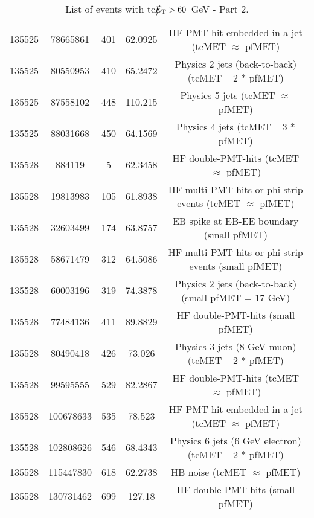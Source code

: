 \begin{table}[htbp]
\begin{center}
\begin{tabular}{|c|c|c|c|c|}
      135525  & 78665861     & 401  &    62.0925 & HF PMT hit embedded in a jet (tcMET $\approx$ pfMET) \\
      135525  & 80550953     & 410  &    65.2472 & Physics 2 jets (back-to-back) (tcMET ~ 2 * pfMET) \\
      135525  & 87558102     & 448  &    110.215 & Physics 5 jets (tcMET $\approx$ pfMET) \\ 
      135525  & 88031668     & 450  &    64.1569 & Physics 4 jets (tcMET ~ 3 * pfMET) \\
      135528  & 884119       & 5    &    62.3458 & HF double-PMT-hits (tcMET $\approx$ pfMET) \\
      135528  & 19813983     & 105  &    61.8938 & HF multi-PMT-hits or phi-strip events (tcMET $\approx$ pfMET) \\
      135528  & 32603499     & 174  &    63.8757 & EB spike at EB-EE boundary (small pfMET) \\
      135528  & 58671479     & 312  &    64.5086 & HF multi-PMT-hits or phi-strip events (small pfMET) \\
      135528  & 60003196     & 319  &    74.3878 & Physics 2 jets (back-to-back) (small pfMET = 17 GeV) \\
      135528  & 77484136     & 411  &    89.8829 & HF double-PMT-hits (small pfMET) \\
      135528  & 80490418     & 426  &    73.026  & Physics 3 jets (8 GeV muon) (tcMET ~ 2 * pfMET) \\
      135528  & 99595555     & 529  &    82.2867 & HF double-PMT-hits (tcMET $\approx$ pfMET) \\
      135528  & 100678633    & 535  &    78.523  & HF PMT hit embedded in a jet (tcMET $\approx$ pfMET) \\
      135528  & 102808626    & 546  &    68.4343 & Physics 6 jets (6 GeV electron) (tcMET ~ 2 * pfMET) \\
      135528  & 115447830    & 618  &    62.2738 & HB noise (tcMET $\approx$ pfMET) \\
      135528  & 130731462    & 699  &    127.18  & HF double-PMT-hits (small pfMET) \\
      \hline
    \end{tabular}
    \caption{List of events with tc$\big\slash\hspace{-1.6ex}{E_\text{T}}>60$~GeV - Part 2.}        
    \label{tab:tcMETlist2}
  \end{center}
\end{table}


